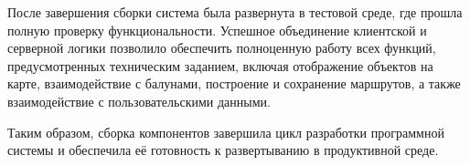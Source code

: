 После завершения сборки система была развернута в тестовой среде, где прошла полную проверку функциональности. Успешное объединение клиентской и серверной логики позволило обеспечить полноценную работу всех функций, предусмотренных техническим заданием, включая отображение объектов на карте, взаимодействие с балунами, построение и сохранение маршрутов\cite{b30}, а также взаимодействие с пользовательскими данными.

Таким образом, сборка компонентов завершила цикл разработки программной системы и обеспечила её готовность к развертыванию в продуктивной среде.
